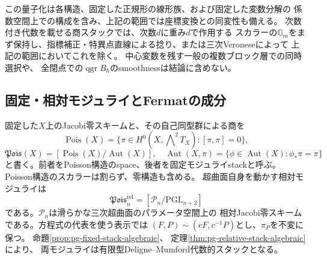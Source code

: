 この量子化は各構造、固定した正規形の線形族、および固定した変数分解の
係数空間上での構成を含み、上記の範囲では座標変換との同変性も備える。
次数付き代数を載せる商スタックでは、次数$d$に重み$d$で作用する
スカラーの$\mathbb G_m$をまず保持し、指標補正・特異点直線による捻り、または三次Veroneseによって
上記の範囲においてこれを除く。
中心変数を残す一般の複数ブロック層での同時選択や、
全閉点での$\operatorname{qgr}B_\hbar$のsmoothnessは結論に含めない。

\subsection*{固定・相対モジュライとFermatの成分}
固定した$X$上のJacobi零スキームと、その自己同型群による商を
\begin{equation}\label{eq:intro-poisson-space}
 \operatorname{Pois}(X)=
 \{\pi\in H^0(X,\bigwedge\nolimits^2T_X):[\pi,\pi]=0\},
\end{equation}
\begin{equation}\label{eq:intro-poisson-fixed-stack}
 \mathfrak{Pois}(X)=[\operatorname{Pois}(X)/\operatorname{Aut}(X)],
 \quad \operatorname{Aut}(X,\pi)=
 \{\phi\in\operatorname{Aut}(X):\phi_*\pi=\pi\}
\end{equation}
と書く。前者をPoisson構造のspace、後者を固定モジュライstackと呼ぶ。
Poisson構造のスカラーは割らず、零構造も含める。
超曲面自身を動かす相対モジュライは
\begin{equation}\label{eq:intro-poisson-relative-stack}
 \mathfrak{Pois}^{\mathrm{rel}}_n=[\mathscr P_n/\mathrm{PGL}_{n+2}]
\end{equation}
である。$\mathscr P_n$は滑らかな三次超曲面のパラメータ空間上の
相対Jacobi零スキームである。方程式の代表を使う表示では
$(F,P)\sim(cF,c^{-1}P)$とし、$\pi_P$を不変に保つ。
命題\ref{prop:pg-fixed-stack-algebraic}、
定理\ref{thm:pg-relative-stack-algebraic}により、
両モジュライは有限型Deligne--Mumford代数的スタックとなる。

